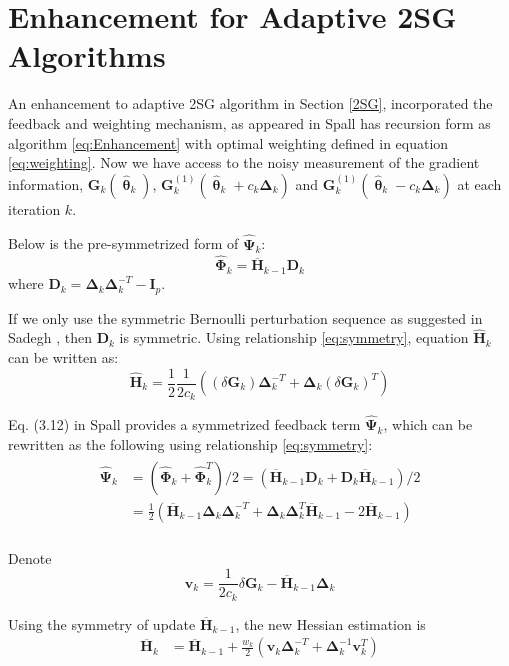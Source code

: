 \documentclass[conference]{IEEEtran}
\newcommand{\bD}{\bm{D}}
\newcommand{\bG}{\bm{G}}
\newcommand{\bI}{\bm{I}}
\newcommand{\bDelta}{\bm{\Delta}}
\newcommand{\oH}{\bm{\overline{H}}}
\newcommand{\hH}{\bm{\hat{H}}}
\newcommand{\hPsi}{\bm{\hat{\Psi}}}
\newcommand{\htheta}{\bm{\hat{\uptheta}}}
\newcommand{\hPhi}{\bm{\hat{\Phi}}}
\begin{document}
\section{Enhancement for Adaptive 2SG Algorithms} \label{Enhanced 2SG}
An enhancement to adaptive 2SG algorithm in Section \ref{2SG}, incorporated the feedback and weighting mechanism, as appeared in Spall \cite{Spall2009} has recursion form as algorithm \ref{eq:Enhancement} with optimal weighting defined in equation \ref{eq:weighting}. Now we have access to the noisy measurement of the gradient information, $\bG_k(\htheta_k)$, $\bG_k^{(1)}(\htheta_k+ c_k\bDelta_k)$ and $\bG_k^{(1)}(\htheta_k- c_k\bDelta_k)$ at each iteration $k$.

Below is the pre-symmetrized form of $ \hPsi_k $:
\begin{equation}
\hPhi_k=\oH_{k-1}\bD_k
\end{equation}
where $ \bD_k=\bDelta_k\bDelta_k^{-T}-\bI_p$.

If we only use the symmetric Bernoulli perturbation sequence as
suggested in Sadegh \cite{Sadegh1998}, then $\bD_k$ is
symmetric. Using relationship \ref{eq:symmetry}, equation
$\hH_k$ can be written as:
\begin{equation}
\hH_k=\frac{1}{2}\frac{1}{2c_k}\left( (\delta\bG_k)\bDelta_k^{-T}+\bDelta_k(\delta\bG_k)^{T} \right)
\end{equation}

Eq. (3.12) in Spall \cite{Spall2009} provides a symmetrized feedback term $ \hPsi_k $, which can be rewritten as the following using relationship \ref{eq:symmetry}:
\begin{align}
\begin{split}
\hPsi_k &=(\hPhi_k+\hPhi_k^T)/2=(\oH_{k-1}\bD_k+\bD_k\oH_{k-1})/2\\
&=\frac{1}{2}\left( \oH_{k-1}\bDelta_k\bDelta_k^{-T}+\bDelta_k\bDelta_k^{T}\oH_{k-1}-2\oH_{k-1} \right)\\
\end{split}
\end{align}

Denote
\begin{equation}
\bm{v}_k= \frac{1}{2c_k}\delta\bG_k-\oH_{k-1}\bDelta_k
\end{equation}


Using the symmetry of update $\oH_{k-1}$, the new Hessian estimation is
\begin{align*}
\oH_k&=\oH_{k-1}+\frac{w_k}{2} (\bm{v}_k\bDelta_k^{-T}+\bDelta_k^{-1}\bm{v}_k^{T})
\end{align*}
\end{document}
